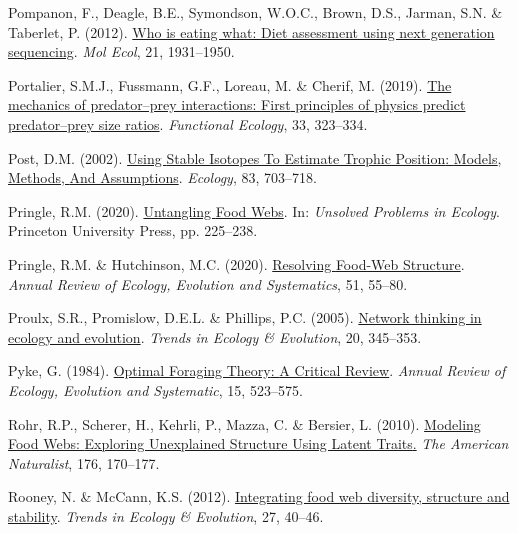 \documentclass[
]{article}
\newlength{\cslhangindent}
\newenvironment{CSLReferences}[2] %
 {\begin{list}{}{%
  \setlength{\itemindent}{0pt}
  \setlength{\leftmargin}{0pt}
  \setlength{\parsep}{0pt}
  \ifodd #1
   \setlength{\leftmargin}{\cslhangindent}
   \setlength{\itemindent}{-1\cslhangindent}
  \fi
  \setlength{\itemsep}{#2\baselineskip}}}
 {\end{list}}
\begin{document}
\begin{CSLReferences}{1}{0}
Pompanon, F., Deagle, B.E., Symondson, W.O.C., Brown, D.S., Jarman, S.N.
\& Taberlet, P. (2012).
\href{https://doi.org/10.1111/j.1365-294X.2011.05403.x}{Who is eating
what: Diet assessment using next generation sequencing}. \emph{Mol
Ecol}, 21, 1931--1950.

Portalier, S.M.J., Fussmann, G.F., Loreau, M. \& Cherif, M. (2019).
\href{https://doi.org/10.1111/1365-2435.13254}{The mechanics of
predator--prey interactions: {First} principles of physics predict
predator--prey size ratios}. \emph{Functional Ecology}, 33, 323--334.

Post, D.M. (2002).
\href{https://doi.org/10.1890/0012-9658(2002)083\%5B0703:USITET\%5D2.0.CO;2}{Using
{Stable Isotopes To Estimate Trophic Position}: {Models}, {Methods},
{And Assumptions}}. \emph{Ecology}, 83, 703--718.

Pringle, R.M. (2020).
\href{https://doi.org/10.1515/9780691195322-020}{Untangling {Food
Webs}}. In: \emph{Unsolved {Problems} in {Ecology}}. Princeton
University Press, pp. 225--238.

Pringle, R.M. \& Hutchinson, M.C. (2020).
\href{https://doi.org/10.1146/annurev-ecolsys-110218-024908}{Resolving
{Food-Web Structure}}. \emph{Annual Review of Ecology, Evolution and
Systematics}, 51, 55--80.

Proulx, S.R., Promislow, D.E.L. \& Phillips, P.C. (2005).
\href{https://doi.org/10.1016/j.tree.2005.04.004}{Network thinking in
ecology and evolution}. \emph{Trends in Ecology \& Evolution}, 20,
345--353.

Pyke, G. (1984).
\href{https://doi.org/10.1146/annurev.ecolsys.15.1.523}{Optimal
{Foraging Theory}: {A Critical Review}}. \emph{Annual Review of Ecology,
Evolution and Systematic}, 15, 523--575.

Rohr, R.P., Scherer, H., Kehrli, P., Mazza, C. \& Bersier, L. (2010).
\href{https://doi.org/10.1086/653667}{Modeling {Food Webs}: {Exploring
Unexplained Structure Using Latent Traits}.} \emph{The American
Naturalist}, 176, 170--177.

Rooney, N. \& McCann, K.S. (2012).
\href{https://doi.org/10.1016/j.tree.2011.09.001}{Integrating food web
diversity, structure and stability}. \emph{Trends in Ecology \&
Evolution}, 27, 40--46.


\end{CSLReferences}
\end{document}
